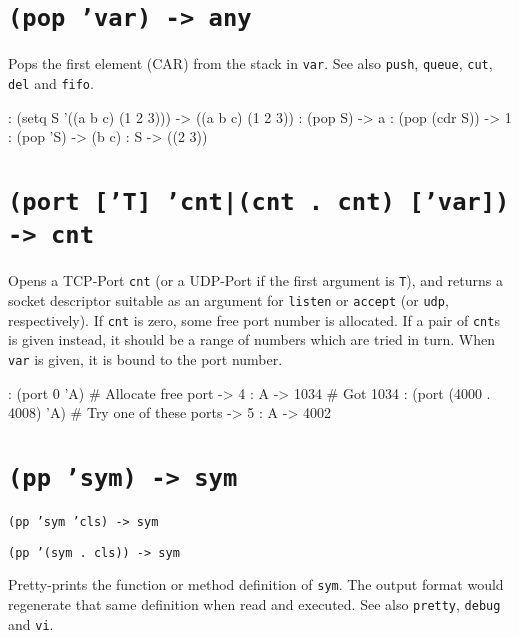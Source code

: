  
\section*{\texttt{(pop 'var) -> any}}
\label{sec:func-ref-P-(pop 'var) -> any}


Pops the first element (CAR) from the stack in \texttt{var}. See also \texttt{push},
\texttt{queue}, \texttt{cut}, \texttt{del} and \texttt{fifo}.


\begin{wideverbatim}
: (setq S '((a b c) (1 2 3)))
-> ((a b c) (1 2 3))
: (pop S)
-> a
: (pop (cdr S))
-> 1
: (pop 'S)
-> (b c)
: S
-> ((2 3))
\end{wideverbatim}

 
\section*{\texttt{(port ['T] 'cnt|(cnt . cnt) ['var]) -> cnt}}
\label{sec:func-ref-P-(port ['T] 'cnt|(cnt . cnt) ['var]) -> cnt}


Opens a TCP-Port \texttt{cnt} (or a UDP-Port if the first argument is \texttt{T}), and
returns a socket descriptor suitable as an argument for \texttt{listen} or
\texttt{accept} (or \texttt{udp}, respectively). If \texttt{cnt} is zero, some free port
number is allocated. If a pair of \texttt{cnt}s is given instead, it should be a range of numbers which are tried in turn. When \texttt{var} is given, it is
bound to the port number.


\begin{wideverbatim}
: (port 0 'A)                       # Allocate free port
-> 4
: A
-> 1034                             # Got 1034
: (port (4000 . 4008) 'A)           # Try one of these ports
-> 5
: A
-> 4002
\end{wideverbatim}

 
\section*{\texttt{(pp 'sym) -> sym}}
\label{sec:func-ref-P-(pp 'sym) -> sym}


\texttt{(pp 'sym 'cls) -> sym}

\texttt{(pp '(sym . cls)) -> sym}

Pretty-prints the function or method definition of \texttt{sym}. The output
format would regenerate that same definition when read and executed. See
also \texttt{pretty}, \texttt{debug} and \texttt{vi}.


